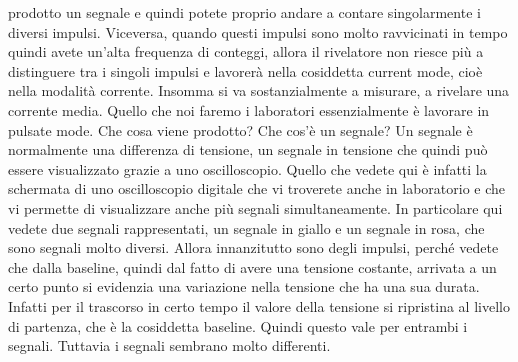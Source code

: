 prodotto un segnale e quindi potete proprio andare a contare singolarmente i diversi impulsi. Viceversa, quando questi impulsi sono molto ravvicinati in tempo quindi avete un'alta frequenza di conteggi, allora il rivelatore non riesce più a distinguere tra i singoli impulsi e lavorerà nella cosiddetta current mode, cioè nella modalità corrente. Insomma si va sostanzialmente a misurare, a rivelare una corrente media. Quello che noi faremo i laboratori essenzialmente è lavorare in pulsate mode. Che cosa viene prodotto? Che cos'è un segnale? Un segnale è normalmente una differenza di tensione, un segnale in tensione che quindi può essere visualizzato grazie a uno oscilloscopio. Quello che vedete qui è infatti la schermata di uno oscilloscopio digitale che vi troverete anche in laboratorio e che vi permette di visualizzare anche più segnali simultaneamente. In particolare qui vedete due segnali rappresentati, un segnale in giallo e un segnale in rosa, che sono segnali molto diversi. Allora innanzitutto sono degli impulsi, perché vedete che dalla baseline, quindi dal fatto di avere una tensione costante, arrivata a un certo punto si evidenzia una variazione nella tensione che ha una sua durata. Infatti per il trascorso in certo tempo il valore della tensione si ripristina al livello di partenza, che è la cosiddetta baseline. Quindi questo vale per entrambi i segnali. Tuttavia i segnali sembrano molto differenti. 

